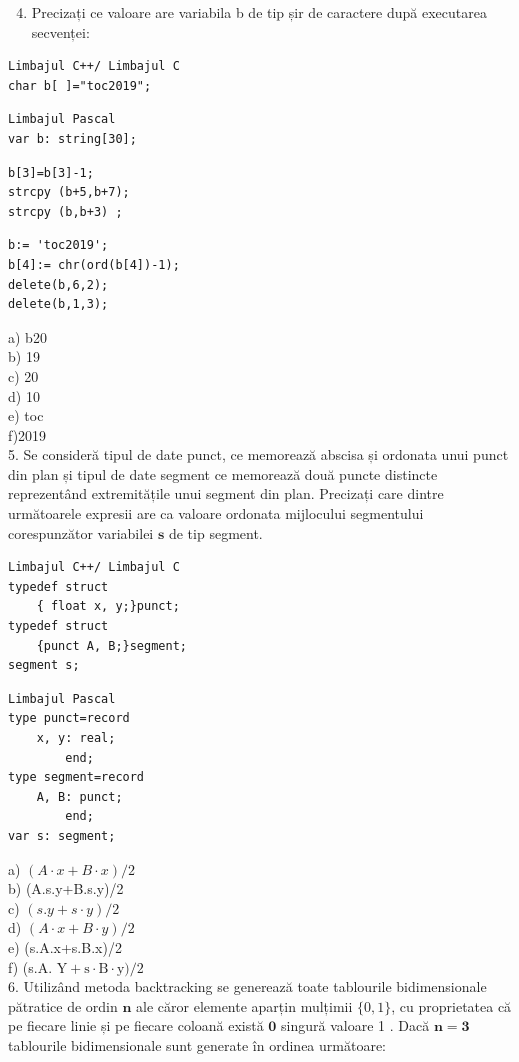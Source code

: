 \documentclass[10pt]{article}
\begin{document}
\begin{enumerate}
  \setcounter{enumi}{3}
  \item Precizați ce valoare are variabila b de tip șir de caractere după executarea secvenței:
\end{enumerate}

\begin{verbatim}
Limbajul C++/ Limbajul C
char b[ ]="toc2019";
\end{verbatim}

\begin{verbatim}
Limbajul Pascal
var b: string[30];
\end{verbatim}

\begin{verbatim}
b[3]=b[3]-1;
strcpy (b+5,b+7);
strcpy (b,b+3) ;
\end{verbatim}

\begin{verbatim}
b:= 'toc2019';
b[4]:= chr(ord(b[4])-1);
delete(b,6,2);
delete(b,1,3);
\end{verbatim}

a) b20\\
b) 19\\
c) 20\\
d) 10\\
e) toc\\
f)2019\\
5. Se consideră tipul de date punct, ce memorează abscisa și ordonata unui punct din plan și tipul de date segment ce memorează două puncte distincte reprezentând extremitățile unui segment din plan. Precizați care dintre următoarele expresii are ca valoare ordonata mijlocului segmentului corespunzător variabilei $\mathbf{s}$ de tip segment.

\begin{verbatim}
Limbajul C++/ Limbajul C
typedef struct
    { float x, y;}punct;
typedef struct
    {punct A, B;}segment;
segment s;
\end{verbatim}

\begin{verbatim}
Limbajul Pascal
type punct=record
    x, y: real;
        end;
type segment=record
    A, B: punct;
        end;
var s: segment;
\end{verbatim}

a) $(A \cdot x+B \cdot x) / 2$\\
b) (A.s.y+B.s.y)/2\\
c) $(s . y+s \cdot y) / 2$\\
d) $(A \cdot x+B \cdot y) / 2$\\
e) (s.A.x+s.B.x)/2\\
f) (s.A. $\mathrm{Y}+\mathrm{s} \cdot \mathrm{B} \cdot \mathrm{y}) / 2$\\
6. Utilizând metoda backtracking se generează toate tablourile bidimensionale pătratice de ordin $\mathbf{n}$ ale căror elemente aparțin mulțimii $\{0,1\}$, cu proprietatea că pe fiecare linie și pe fiecare coloană există $\mathbf{0}$ singură valoare 1 . Dacă $\mathbf{n}=\mathbf{3}$ tablourile bidimensionale sunt generate în ordinea următoare:
\end{document}
